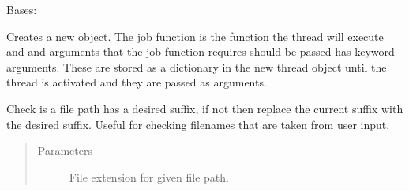 \documentclass[letterpaper,10pt,english]{sphinxmanual}
\begin{document}
\begin{fulllineitems}
\label{\detokenize{polo.utils:polo.utils.io_utils.RunSerializer}}
Bases: 

\begin{fulllineitems}
\label{\detokenize{polo.utils:polo.utils.io_utils.RunSerializer.make_thread}}
Creates a new  object. The job function is the
function the thread will execute and and arguments that the job
function requires should be passed has keyword arguments. These are
stored as a dictionary in the new thread object until the thread is
activated and they are passed as arguments.

\end{fulllineitems}


\begin{fulllineitems}
\label{\detokenize{polo.utils:polo.utils.io_utils.RunSerializer.path_suffix_checker}}
Check is a file path has a desired suffix, if not then replace the
current suffix with the desired suffix. Useful for checking filenames
that are taken from user input.
\begin{quote}\begin{description}
\item[{Parameters}] \leavevmode
{} \textendash{} File extension for given file path.

\end{description}\end{quote}

\end{fulllineitems}


\end{fulllineitems}
\end{document}
